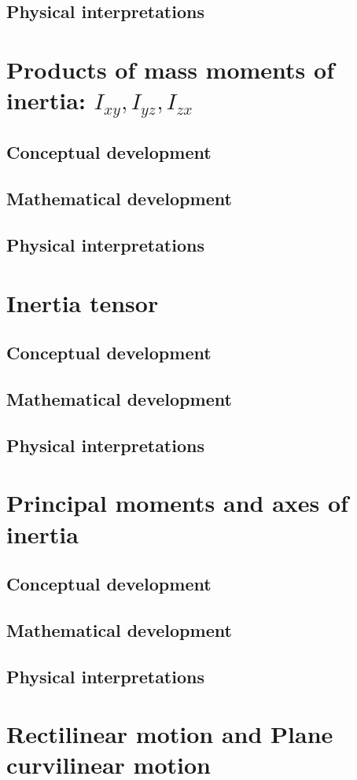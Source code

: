 \subsection{Physical interpretations}

\section{Products of mass moments of inertia: $I_{xy}, I_{yz}, I_{zx}$}
\subsection{Conceptual development}
\subsection{Mathematical development}
\subsection{Physical interpretations}

\section{Inertia tensor}
\subsection{Conceptual development}
\subsection{Mathematical development}
\subsection{Physical interpretations}

\section{Principal moments and axes of inertia}
\subsection{Conceptual development}
\subsection{Mathematical development}
\subsection{Physical interpretations}

\section{Rectilinear motion and Plane curvilinear motion}